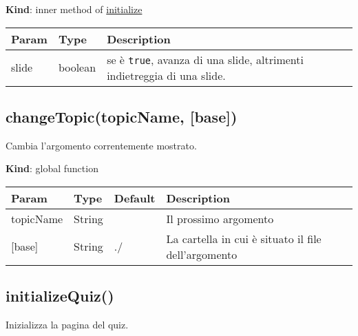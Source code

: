 \textbf{Kind}: inner method of
\protect\hyperlink{initialize}{initialize}

\begin{longtable}[]{@{}lll@{}}
\toprule
\begin{minipage}[b]{0.30\columnwidth}\raggedright
Param\strut
\end{minipage} & \begin{minipage}[b]{0.30\columnwidth}\raggedright
Type\strut
\end{minipage} & \begin{minipage}[b]{0.30\columnwidth}\raggedright
Description\strut
\end{minipage}\tabularnewline
\midrule
\endhead
\begin{minipage}[t]{0.30\columnwidth}\raggedright
slide\strut
\end{minipage} & \begin{minipage}[t]{0.30\columnwidth}\raggedright
boolean\strut
\end{minipage} & \begin{minipage}[t]{0.30\columnwidth}\raggedright
se è \texttt{true}, avanza di una slide, altrimenti indietreggia di una
slide.\strut
\end{minipage}\tabularnewline
\bottomrule
\end{longtable}

\hypertarget{changetopictopicname-base-1}{%
\subsection{changeTopic(topicName,
{[}base{]})}\label{changetopictopicname-base-1}}

Cambia l'argomento correntemente mostrato.

\textbf{Kind}: global function

\begin{longtable}[]{@{}llll@{}}
\toprule
Param & Type & Default & Description\tabularnewline
\midrule
\endhead
topicName & String & & Il prossimo argomento\tabularnewline
{[}base{]} & String & ./ & La cartella in cui è situato il file
dell'argomento\tabularnewline
\bottomrule
\end{longtable}

\hypertarget{initializequiz-1}{%
\subsection{initializeQuiz()}\label{initializequiz-1}}

Inizializza la pagina del quiz.

